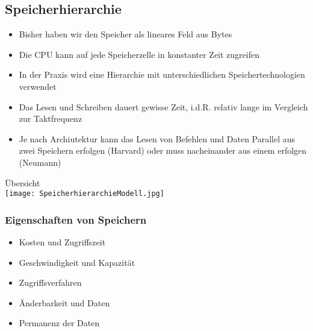 	\subsection{Speicherhierarchie}
		\begin{minipage}{0.5\textwidth}
			\begin{itemize}
				\item Bisher haben wir den Speicher als lineares Feld aus Bytes
				\item Die CPU kann auf jede Speicherzelle in konstanter Zeit zugreifen
				\item In der Praxis wird eine Hierarchie mit unterschiedlichen Speichertechnologien verwendet \\
			\end{itemize}
	
			\begin{itemize}
				\item Das Lesen und Schreiben dauert gewisse Zeit, i.d.R. relativ lange im Vergleich zur Taktfrequenz
				\item Je nach Archiutektur kann das Lesen von Befehlen und Daten Parallel aus zwei Speichern erfolgen
					(Harvard) oder muss nacheinander aus einem erfolgen (Neumann)
			\end{itemize}
		\end{minipage}
		\begin{minipage}{0.45\textwidth}
			\begin{center}
				Übersicht \\
				\texttt{[image: SpeicherhierarchieModell.jpg]}
			\end{center}
		\end{minipage}

		
		\subsubsection{Eigenschaften von Speichern}
			\begin{itemize}
				\item Kosten und Zugriffszeit
				\item Geschwindigkeit und Kapazität
				\item Zugriffsverfahren
				\item Änderbarkeit und Daten
				\item Permanenz der Daten
			\end{itemize}

